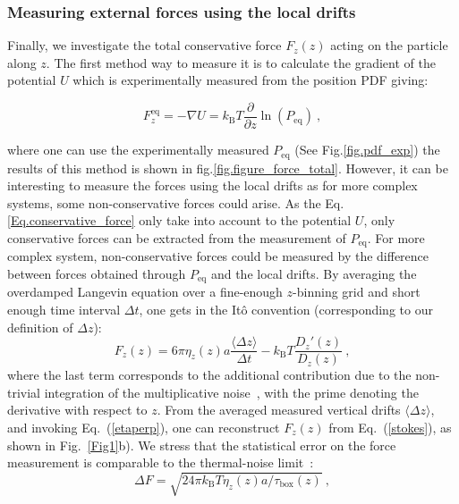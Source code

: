 \subsubsection{Measuring external forces using the local drifts}
Finally, we investigate the total conservative force $F_z(z)$ acting on the particle along $z$. The first method way to measure it is to calculate the gradient of the potential $U$ which is experimentally measured from the position \gls{PDF} giving:


\begin{equation}
	F_z^\mathrm{eq} = -\nabla U = k_\mathrm{B}T \frac{\partial}{\partial z} \ln (P_\mathrm{eq}) ~,
	\label{Eq.conservative_force}
\end{equation}

where one can use the experimentally measured $P_\mathrm{eq}$ (See Fig.\ref{fig.pdf_exp}) the results of this method is shown in fig.\ref{fig.figure_force_total}. However, it can be interesting to measure the forces using the local drifts as for more complex systems, some non-conservative forces could arise. As the Eq.\ref{Eq.conservative_force} only take into account to the potential $U$, only conservative forces can be extracted from the measurement of $P_\mathrm{eq}$. For more complex system, non-conservative forces could be measured by the difference between forces obtained through $P_\mathrm{eq}$ and the local drifts.  By averaging the overdamped Langevin equation over a fine-enough $z$-binning grid and short enough time interval $\Delta t$, one gets in the Itô convention (corresponding to our definition of $\Delta z$):
\begin{equation}
	F_z (z) = 6 \pi \eta_z (z ) a \frac{\langle\Delta z\rangle}{\Delta t} - k_\mathrm{B}T \frac{D_z'(z)}{D_z(z)} \ ,
	\label{stokes}
\end{equation}
where the last term corresponds to the additional contribution due to the non-trivial integration of the multiplicative noise~\cite{volpe_influence_2010,mannella_comment_2011,mannella_ito_2012, sancho_brownian_2011}, with the prime denoting the derivative with respect to $z$. From the averaged measured vertical drifts $\langle\Delta z\rangle$, and invoking Eq.~(\ref{etaperp}), one can reconstruct $F_z(z)$ from Eq.~(\ref{stokes}), as shown in Fig.~\ref{Fig1}b). We stress that the statistical error on the force measurement is comparable to the thermal-noise limit~\cite{liu_subfemtonewton_2016}: 
\begin{equation}
	\label{tnl}
	\Delta F=\sqrt{24\pi k_{\mathrm{B}}T \eta_z(z) a/ \tau_{\textrm{box}}(z)}\ ,
\end{equation}
